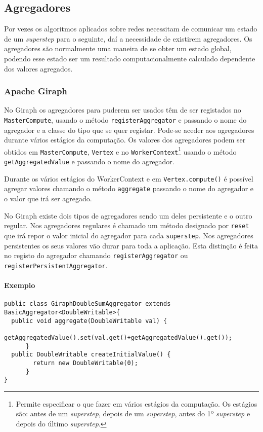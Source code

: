 \subsection{Agregadores}
\label{ss:agreg}
  Por vezes os algoritmos aplicados sobre redes necessitam de comunicar um 
estado de um \textit{superstep} para o seguinte, daí a necessidade de existirem 
agregadores. Os agregadores são normalmente uma maneira de se obter um estado 
global, podendo esse estado ser um resultado computacionalmente calculado 
dependente dos valores agregados.

  \subsubsection*{Apache Giraph}
    No Giraph os agregadores para puderem ser usados têm de ser registados no 
\texttt{MasterCompute}, usando o método \texttt{registerAggregator} e
    passando o nome do agregador e a classe do tipo que se quer registar. 
Pode-se aceder aos agregadores durante vários estágios da computação.
    Os valores dos agregadores podem ser obtidos em \texttt{MasterCompute}, 
\texttt{Vertex} e no \texttt{WorkerContext}\footnote{Permite 
especificar o que fazer em vários estágios da computação. Os estágios são: 
antes de um \textit{superstep}, depois de um \textit{superstep}, antes do 1º \textit{superstep} e depois do 
último \textit{superstep}.} usando o método \texttt{getAggregatedValue} e 
passando
    o nome do agregador.
    
    Durante os vários estágios do WorkerContext e em \texttt{Vertex.compute()} é possível agregar valores chamando o 
método \texttt{aggregate} passando o nome do agregador e o valor que irá ser agregado.
    
    No Giraph existe dois tipos de agregadores sendo um deles persistente e o 
outro regular. Nos agregadores regulares é chamado um método
    designado por \texttt{reset} que irá repor o valor inicial do agregador 
para cada \texttt{superstep}. Nos agregadores persistentes os seus valores vão 
durar
    para toda a aplicação. Esta distinção é feita no registo do agregador chamando \texttt{registerAggregator} 
    ou \texttt{registerPersistentAggregator}.
    
\paragraph{Exemplo}
\begin{verbatim}
public class GiraphDoubleSumAggregator extends BasicAggregator<DoubleWritable>{
  public void aggregate(DoubleWritable val) {
	    getAggregatedValue().set(val.get()+getAggregatedValue().get());
	  }
  public DoubleWritable createInitialValue() {
	    return new DoubleWritable(0);
	  }
}
\end{verbatim} 

